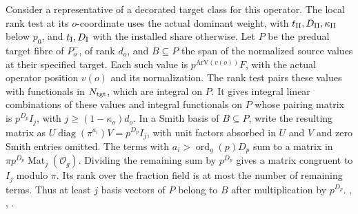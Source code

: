 Consider a representative of a decorated target class for this
operator. The local rank test at its \(o\)-coordinate uses the
actual dominant weight, with \(t_{\rm II},D_{\rm II},\kappa_{\rm II}\)
below \(p_0\), and \(t_{\rm I},D_{\rm I}\) with the installed share
otherwise. Let \(P\) be the predual target fibre of \(P_o^-\), of
rank \(d_o\), and \(B\subseteq P\) the span of the normalized
source values at their specified target. Each such value is
\(p^{\mathrm{ArV}(v(o))}F\), with the actual operator position
\(v(o)\) and its normalization. The rank test pairs these values
with functionals in \(N_{\rm tgt}\), which are integral on \(P\).
It gives
integral linear combinations of these values and integral
functionals on \(P\) whose pairing matrix is \(p^{D_p}I_j\), with
\(j\ge(1-\kappa_o)d_o\). In a Smith basis of \(B\subseteq P\),
write the resulting matrix as
\(U\operatorname{diag}(\pi^{a_i})V=p^{D_p}I_j\), with unit
factors absorbed in \(U\) and \(V\) and zero Smith entries omitted.
The terms with \(a_i>\operatorname{ord}_g(p)D_p\) sum to a matrix
in \(\pi p^{D_p}\operatorname{Mat}_j(\mathcal O_g)\). Dividing the
remaining sum by \(p^{D_p}\) gives a matrix congruent to \(I_j\)
modulo \(\pi\). Its rank over the fraction field is at most the
number of remaining terms. Thus at least \(j\) basis vectors
of \(P\) belong to \(B\) after multiplication by \(p^{D_p}\).
,
,
.

